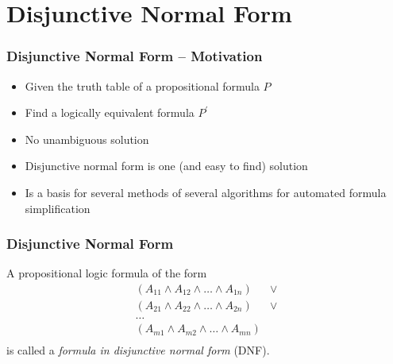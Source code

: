 \documentclass{beamer}
\theoremstyle{remark}
\begin{document}
\section{Disjunctive Normal Form}
\begin{frame}
	\frametitle{Disjunctive Normal Form -- Motivation}
	\begin{itemize}
	\item Given the truth table of a propositional formula $P$
	\item Find a logically equivalent formula $P^{\prime}$
	\pause
	\item No unambiguous solution
	\pause
	\item Disjunctive normal form is one (and easy to find) solution
	\pause
	\item Is a basis for several methods of several algorithms for automated formula simplification
\end{itemize}

\end{frame}

\begin{frame}
	\frametitle{Disjunctive Normal Form}
	\begin{definition}
	A propositional logic formula of the form
	\begin{align*}
		(A_{11} \land A_{12} \land \ldots \land A_{1n}) & \lor \\
		(A_{21} \land A_{22} \land \ldots \land A_{2n}) & \lor \\
		\ldots \\
		(A_{m1} \land A_{m2} \land \ldots \land A_{mn}) & \\
	\end{align*}
	is called a {\em formula in disjunctive normal form} (DNF).
\end{definition}

\end{frame}
\end{document}
